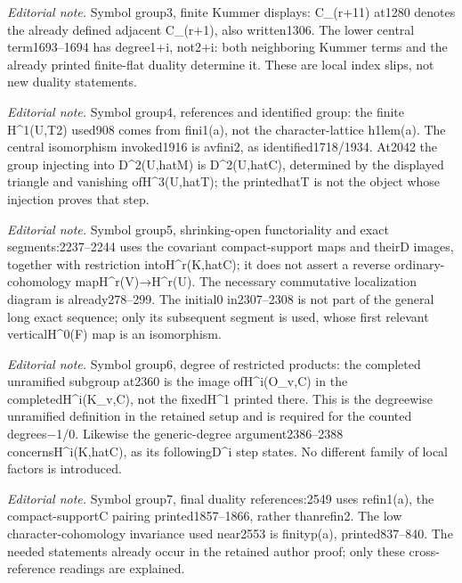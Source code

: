 \documentclass[10pt,a4paper]{amsart}
\theoremstyle{plain}
\theoremstyle{definition}
\begin{document}
\noindent\textit{Editorial note.} Symbol group3, finite Kummer displays: C\_(r+11) at1280 denotes the already defined adjacent C\_(r+1), also written1306. The lower central term1693–1694 has degree1+i, not2+i: both neighboring Kummer terms and the already printed finite-flat duality determine it. These are local index slips, not new duality statements.\par\medskip
\noindent\textit{Editorial note.} Symbol group4, references and identified group: the finite H\textasciicircum{}1(U,T2) used908 comes from fini1(a), not the character-lattice h1lem(a). The central isomorphism invoked1916 is avfini2, as identified1718/1934. At2042 the group injecting into D\textasciicircum{}2(U,hatM) is D\textasciicircum{}2(U,hatC), determined by the displayed triangle and vanishing ofH\textasciicircum{}3(U,hatT); the printedhatT is not the object whose injection proves that step.\par\medskip
\noindent\textit{Editorial note.} Symbol group5, shrinking-open functoriality and exact segments:2237–2244 uses the covariant compact-support maps and theirD images, together with restriction intoH\textasciicircum{}r(K,hatC); it does not assert a reverse ordinary-cohomology mapH\textasciicircum{}r(V)→H\textasciicircum{}r(U). The necessary commutative localization diagram is already278–299. The initial0 in2307–2308 is not part of the general long exact sequence; only its subsequent segment is used, whose first relevant verticalH\textasciicircum{}0(F) map is an isomorphism.\par\medskip
\noindent\textit{Editorial note.} Symbol group6, degree of restricted products: the completed unramified subgroup at2360 is the image ofH\textasciicircum{}i(O\_v,C) in the completedH\textasciicircum{}i(K\_v,C), not the fixedH\textasciicircum{}1 printed there. This is the degreewise unramified definition in the retained setup and is required for the counted degrees−1/0. Likewise the generic-degree argument2386–2388 concernsH\textasciicircum{}i(K,hatC), as its followingD\textasciicircum{}i step states. No different family of local factors is introduced.\par\medskip
\noindent\textit{Editorial note.} Symbol group7, final duality references:2549 uses refin1(a), the compact-supportC pairing printed1857–1866, rather thanrefin2. The low character-cohomology invariance used near2553 is finityp(a), printed837–840. The needed statements already occur in the retained author proof; only these cross-reference readings are explained.\par\medskip
\end{document}
